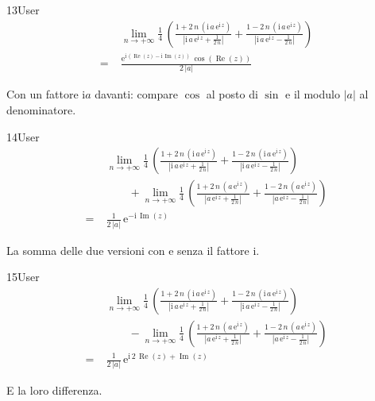 \begin{espr}{13}{User}{}
\begin{align*}
& \lim_{n \to +\infty} \frac{1}{4}\, \left(\frac{1 + 2\, n\, \left(\mathrm{i}\, a\, \mathrm{e}^{\mathrm{i}\, z}\right)}{\left|\mathrm{i}\, a\, \mathrm{e}^{\mathrm{i}\, z} + \frac{1}{2\, n}\right|} + \frac{1 - 2\, n\, \left(\mathrm{i}\, a\, \mathrm{e}^{\mathrm{i}\, z}\right)}{\left|\mathrm{i}\, a\, \mathrm{e}^{\mathrm{i}\, z} - \frac{1}{2\, n}\right|}\right) \\
=\;& \frac{\mathrm{e}^{\mathrm{i}\, \left(\operatorname{Re}\!\left(z\right) - \mathrm{i}\, \operatorname{Im}\!\left(z\right)\right)}\, \cos\!\left(\operatorname{Re}\!\left(z\right)\right)}{2\, \left|a\right|}
\end{align*}
\end{espr}
Con un fattore $\mathrm{i}a$ davanti: compare $\cos$ al posto di $\sin$ e il modulo $|a|$ al denominatore.

\begin{espr}{14}{User}{}
\begin{align*}
& \lim_{n \to +\infty} \frac{1}{4}\, \left(\frac{1 + 2\, n\, \left(\mathrm{i}\, a\, \mathrm{e}^{\mathrm{i}\, z}\right)}{\left|\mathrm{i}\, a\, \mathrm{e}^{\mathrm{i}\, z} + \frac{1}{2\, n}\right|} + \frac{1 - 2\, n\, \left(\mathrm{i}\, a\, \mathrm{e}^{\mathrm{i}\, z}\right)}{\left|\mathrm{i}\, a\, \mathrm{e}^{\mathrm{i}\, z} - \frac{1}{2\, n}\right|}\right) \\
&\qquad + \lim_{n \to +\infty} \frac{1}{4}\, \left(\frac{1 + 2\, n\, \left(a\, \mathrm{e}^{\mathrm{i}\, z}\right)}{\left|a\, \mathrm{e}^{\mathrm{i}\, z} + \frac{1}{2\, n}\right|} + \frac{1 - 2\, n\, \left(a\, \mathrm{e}^{\mathrm{i}\, z}\right)}{\left|a\, \mathrm{e}^{\mathrm{i}\, z} - \frac{1}{2\, n}\right|}\right) \\
=\;& \frac{1}{2\, \left|a\right|}\, \mathrm{e}^{-\mathrm{i}\, \operatorname{Im}\!\left(z\right)}
\end{align*}
\end{espr}
La somma delle due versioni con e senza il fattore $\mathrm{i}$.

\begin{espr}{15}{User}{}
\begin{align*}
& \lim_{n \to +\infty} \frac{1}{4}\, \left(\frac{1 + 2\, n\, \left(\mathrm{i}\, a\, \mathrm{e}^{\mathrm{i}\, z}\right)}{\left|\mathrm{i}\, a\, \mathrm{e}^{\mathrm{i}\, z} + \frac{1}{2\, n}\right|} + \frac{1 - 2\, n\, \left(\mathrm{i}\, a\, \mathrm{e}^{\mathrm{i}\, z}\right)}{\left|\mathrm{i}\, a\, \mathrm{e}^{\mathrm{i}\, z} - \frac{1}{2\, n}\right|}\right) \\
&\qquad - \lim_{n \to +\infty} \frac{1}{4}\, \left(\frac{1 + 2\, n\, \left(a\, \mathrm{e}^{\mathrm{i}\, z}\right)}{\left|a\, \mathrm{e}^{\mathrm{i}\, z} + \frac{1}{2\, n}\right|} + \frac{1 - 2\, n\, \left(a\, \mathrm{e}^{\mathrm{i}\, z}\right)}{\left|a\, \mathrm{e}^{\mathrm{i}\, z} - \frac{1}{2\, n}\right|}\right) \\
=\;& \frac{1}{2\, \left|a\right|}\, \mathrm{e}^{\mathrm{i}\, 2\, \operatorname{Re}\!\left(z\right) + \operatorname{Im}\!\left(z\right)}
\end{align*}
\end{espr}
E la loro differenza.

